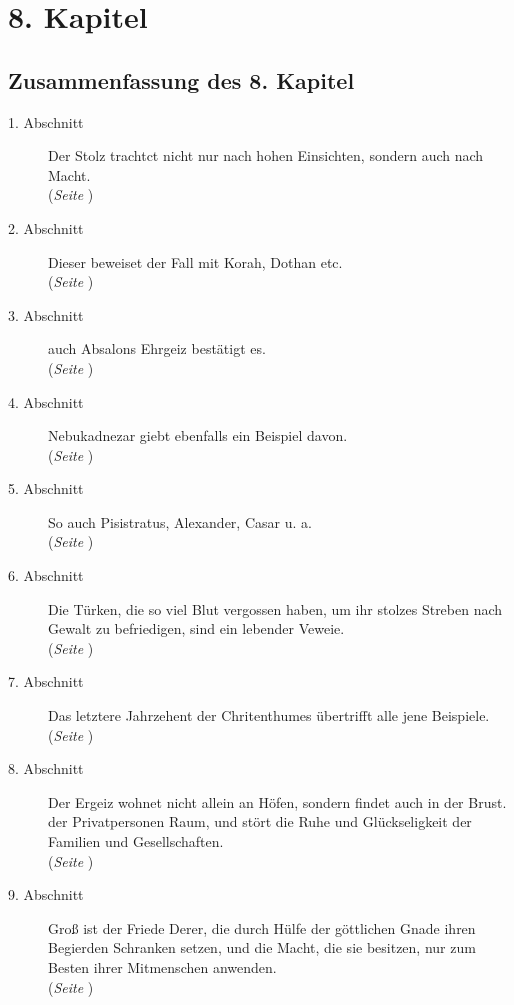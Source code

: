 
\chapter{8. Kapitel} \label{kap8}

\section{Zusammenfassung des 8. Kapitel}

\footnotesize
\begin{description}
\item[1. Abschnitt] Der Stolz trachtct nicht nur nach hohen Einsichten, sondern
auch nach Macht.
\\(\textit{Seite \pageref{kap8_ab1}})
\item[2. Abschnitt] Dieser beweiset der Fall mit Korah, Dothan etc.
\\(\textit{Seite \pageref{kap8_ab2}})
\item[3. Abschnitt] auch Absalons Ehrgeiz bestätigt es.
\\(\textit{Seite \pageref{kap8_ab3}})
\item[4. Abschnitt] Nebukadnezar giebt ebenfalls ein Beispiel davon.
\\(\textit{Seite \pageref{kap8_ab4}})
\item[5. Abschnitt] So auch Pisistratus, Alexander, Casar u. a.
\\(\textit{Seite \pageref{kap8_ab5}})
\item[6. Abschnitt] Die Türken, die so viel Blut vergossen haben, um ihr stolzes
Streben nach Gewalt zu befriedigen, sind ein lebender Veweie.
\\(\textit{Seite \pageref{kap8_ab6}})
\item[7. Abschnitt] Das letztere Jahrzehent der Chritenthumes übertrifft alle
jene Beispiele.
\\(\textit{Seite \pageref{kap8_ab7}})
\item[8. Abschnitt] Der Ergeiz wohnet nicht allein an Höfen, sondern findet auch
in der Brust. der Privatpersonen Raum, und stört die Ruhe und Glückseligkeit der
Familien und Gesellschaften.
\\(\textit{Seite \pageref{kap8_ab8}})
\item[9. Abschnitt] Groß ist der Friede Derer, die durch Hülfe der göttlichen
Gnade ihren Begierden Schranken setzen, und die Macht, die sie besitzen, nur zum
Besten ihrer Mitmenschen anwenden.
\\(\textit{Seite \pageref{kap8_ab9}})

\end{description}
\normalsize

